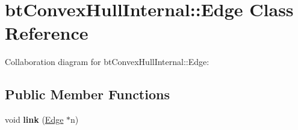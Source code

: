 \hypertarget{classbt_convex_hull_internal_1_1_edge}{\section{bt\+Convex\+Hull\+Internal\+:\+:Edge Class Reference}
\label{classbt_convex_hull_internal_1_1_edge}
}


Collaboration diagram for bt\+Convex\+Hull\+Internal\+:\+:Edge\+:
\subsection*{Public Member Functions}
\begin{DoxyCompactItemize}
\item 
\hypertarget{classbt_convex_hull_internal_1_1_edge_a3d231af3c0b32a13a0ae59e1b44d18c1}{void {\bfseries link} (\hyperlink{classbt_convex_hull_internal_1_1_edge}{Edge} $\ast$n)}\label{classbt_convex_hull_internal_1_1_edge_a3d231af3c0b32a13a0ae59e1b44d18c1}

\end{DoxyCompactItemize}
